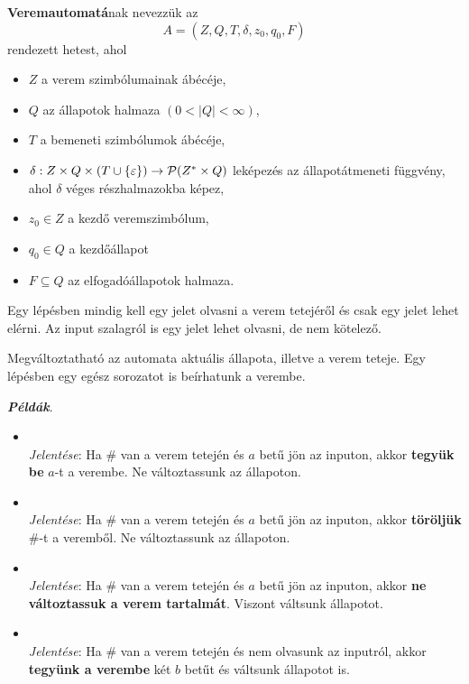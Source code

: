 \begin{tcolorbox}
	\begin{definition}[Veremautomata] \textbf{Veremautomatá}nak nevezzük az
		\[ A = (Z, Q, T, \delta, z_0, q_0, F) \]
		rendezett hetest, ahol
		\begin{itemize}
			\item $Z$ a verem szimbólumainak ábécéje,
			\item $Q$ az állapotok halmaza $(0 < |Q| < \infty)$,
			\item $T$ a bemeneti szimbólumok ábécéje,
			\item $\delta : Z \times Q \times (T \cup \{\varepsilon\}) \to \mathcal{P}(Z^* \times Q)$ leképezés az állapotátmeneti függvény, ahol $\delta$ véges részhalmazokba képez,
			\item $z_0 \in Z$ a kezdő veremszimbólum,
			\item $q_0 \in Q$ a kezdőállapot
			\item $F \subseteq Q$ az elfogadóállapotok halmaza.
		\end{itemize}
	\end{definition}
\end{tcolorbox}

Egy lépésben mindig kell egy jelet olvasni a verem tetejéről és csak egy jelet lehet
elérni. Az input szalagról is egy jelet lehet olvasni, de nem kötelező.

Megváltoztatható az automata aktuális állapota, illetve a verem teteje. Egy lépésben
egy egész sorozatot is beírhatunk a verembe.

\textbf{\textit{Példák}}.
\begin{itemize}
	\item {} \\ \textit{Jelentése}: Ha \# van a verem tetején és $a$ betű jön az inputon, akkor \textbf{tegyük be} $a$-t a verembe. Ne változtassunk az állapoton.
	
	\item {} \\ \textit{Jelentése}: Ha \# van a verem tetején és $a$ betű jön az inputon, akkor \textbf{töröljük} \#-t a veremből. Ne változtassunk az állapoton.
	
	\item {} \\ \textit{Jelentése}: Ha \# van a verem tetején és $a$ betű jön az inputon, akkor \textbf{ne változtassuk a verem tartalmát}. Viszont váltsunk állapotot. 
	
	\item {} \\ \textit{Jelentése}: Ha \# van a verem tetején és nem olvasunk az inputról, akkor \textbf{tegyünk a verembe} két $b$ betűt és váltsunk állapotot is.
\end{itemize}

